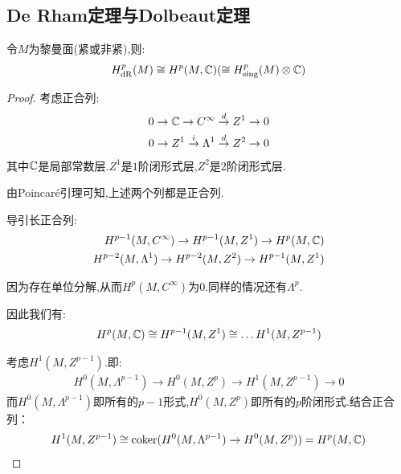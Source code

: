 \subsection*{De Rham定理与Dolbeaut定理}
\begin{theorem}[de Rham定理]
	令$M$为黎曼面(紧或非紧),则:
	\begin{align*}
		H_{\mathrm{dR}}^p(M)\cong H^p(M,\mathbb{C})(\cong H^p_{\mathrm{sing}}(M)\otimes \mathbb{C})
	\end{align*}
\end{theorem}
\begin{proof}
	考虑正合列:
	\begin{align*}
		0 \to \mathbb{C} \to C^\infty \stackrel{d}{\rightarrow} Z^1 \to 0\\
		0 \to Z^1 \stackrel{i}{\rightarrow} \Lambda^1 \stackrel{d}{\rightarrow} Z^2 \to 0 
	\end{align*}
	其中$\mathbb{C}$是局部常数层.$Z^1$是$1$阶闭形式层,$Z^2$是$2$阶闭形式层.

	由Poincar\'{e}引理可知,上述两个列都是正合列.

	导引长正合列:
	\begin{align*}
		H^{p-1}(M,C^\infty) \to H^{p-1}(M,Z^1) \to H^p(M,\mathbb{C})\\
		H^{p-2}(M,\Lambda^1) \to H^{p-2}(M,Z^2) \to H^{p-1}(M,Z^1)\\
	\end{align*}
	
	因为存在单位分解,从而$H^p(M,C^\infty)$为$0$.同样的情况还有$\Lambda^p$.

	因此我们有:
	\begin{align*}
		H^p(M,\mathbb{C})\cong H^{p-1}(M,Z^1) \cong \dots H^1(M,Z^{p-1})
	\end{align*}

	考虑$H^1(M,Z^{p-1})$.即:
	\begin{align*}
		H^0(M,\Lambda^{p-1}) \to H^0(M,Z^p) \to H^1(M,Z^{p-1}) \to 0
	\end{align*}
	而$H^0(M,\Lambda^{p-1})$即所有的$p-1$形式,$H^0(M,Z^p)$即所有的$p$阶闭形式.结合正合列：
	\begin{align*}
		H^1(M,Z^{p-1}) \cong \mathrm{coker}(H^0(M,\Lambda^{p-1}) \to H^0(M,Z^p))=H^p(M,\mathbb{C})
	\end{align*}
\end{proof}
\ifx\allfiles\undefined
	
	
	
	
	\else
	\fi